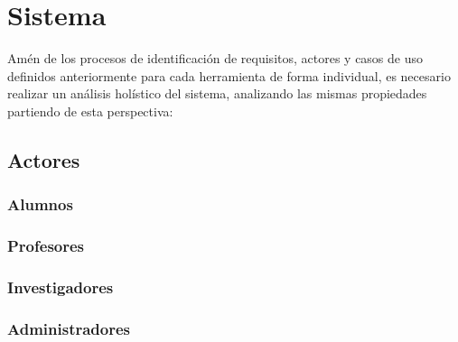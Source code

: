 \chapter{Sistema}

Amén de los procesos de identificación de requisitos, actores y casos de uso definidos anteriormente para cada herramienta de forma individual, es necesario realizar un análisis holístico del sistema, analizando las mismas propiedades partiendo de esta perspectiva:

\section{Actores}

\subsection{Alumnos}

\subsection{Profesores}

\subsection{Investigadores}

\subsection{Administradores}

